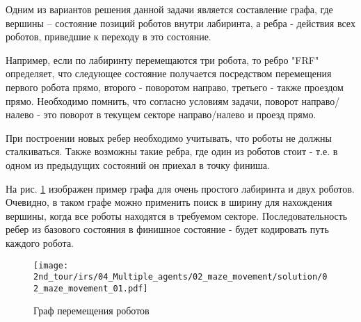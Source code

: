 \solutionSection

Одним из вариантов решения данной задачи является составление графа, где вершины – состояние позиций роботов внутри лабиринта, а ребра - действия всех роботов, приведшие к переходу в это состояние. 

Например, если по лабиринту перемещаются три робота, то ребро "FRF" определяет, что следующее состояние получается посредством перемещения первого робота прямо, второго - поворотом направо, третьего - также проездом прямо. Необходимо помнить, что согласно условиям задачи, поворот направо/налево - это поворот в текущем секторе направо/налево и проезд прямо. 

При построении новых ребер необходимо учитывать, что роботы не должны сталкиваться. Также возможны такие ребра, где один из роботов стоит - т.е. в одном из предыдущих состояний он приехал в точку финиша.

На рис. \ref{fig:02_maze_movement_01} изображен пример графа для очень простого лабиринта и двух роботов. 
Очевидно, в таком графе можно применить поиск в ширину для нахождения вершины, когда все роботы находятся в требуемом секторе. Последовательность ребер из базового состояния в финишное состояние - будет кодировать путь каждого робота.

\begin{figure}[h!]
	\centering
	\texttt{[image: 2nd\_tour/irs/04\_Multiple\_agents/02\_maze\_movement/solution/02\_maze\_movement\_01.pdf]}
	\caption{Граф перемещения роботов}
	\label{fig:02_maze_movement_01}
\end{figure}


\codeExample

{}
